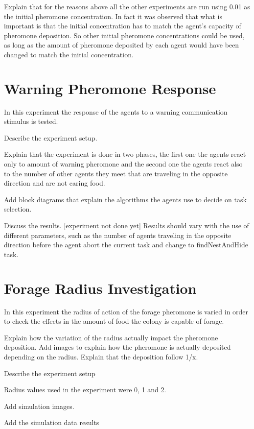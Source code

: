 Explain that for the reasons above all the other experiments are run using 0.01 as the initial pheromone concentration. In fact it was observed that what is important is that the initial concentration has to match the agent's capacity of pheromone deposition. So other initial pheromone concentrations could be used, as long as the amount of pheromone deposited by each agent would have been changed to match the initial concentration.

\section{Warning Pheromone Response}
\label{sec:warn-phero-inv}
In this experiment the response of the agents to a warning communication stimulus is tested.

Describe the experiment setup.

Explain that the experiment is done in two phases, the first one the agents react only to amount of warning pheromone and the second one the agents react also to the number of other agents they meet that are traveling in the opposite direction and are not caring food.

Add block diagrams that explain the algorithms the agents use to decide on task selection.

Discuss the results. [experiment not done yet]
Results should vary with the use of different parameters, such as the number of agents traveling in the opposite direction before the agent abort the current task and change to findNestAndHide task.

\section{Forage Radius Investigation}
\label{sec:forage-radius-inv}

In this experiment the radius of action of the forage pheromone is varied in order to check the effects in the amount of food the colony is capable of forage.

Explain how the variation of the radius actually impact the pheromone deposition. Add images to explain how the pheromone is actually deposited depending on the radius. Explain that the deposition follow 1/x.

Describe the experiment setup

Radius values used in the experiment were 0, 1 and 2.

Add simulation images.

Add the simulation data results

